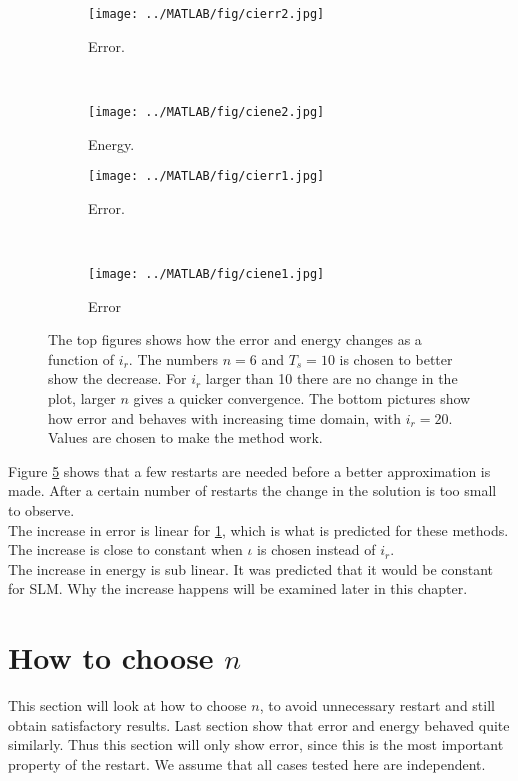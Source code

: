 \begin{figure}[H]
        \centering
        \begin{subfigure}[b]{0.45\textwidth}
                \texttt{[image: ../MATLAB/fig/cierr2.jpg]}
                \caption{ Error. }
                \label{fig:cierr2}
        \end{subfigure}
        ~
		\begin{subfigure}[b]{0.45\textwidth}
                \texttt{[image: ../MATLAB/fig/ciene2.jpg]}
                \caption{ Energy. }
                \label{fig:ciene2}
        \end{subfigure}    

        \begin{subfigure}[b]{0.45\textwidth}
                \texttt{[image: ../MATLAB/fig/cierr1.jpg]}
                \caption{ Error. }
                \label{fig:cierr1}
        \end{subfigure}
        ~
		\begin{subfigure}[b]{0.45\textwidth}
                \texttt{[image: ../MATLAB/fig/ciene1.jpg]}
                \caption{ Error }
                \label{fig:ciene1}
        \end{subfigure}
        \caption{ The top figures shows how the error and energy changes as a function of $i_r$. The numbers $n = 6$ and $T_s = 10$ is chosen to better show the decrease. For $i_r$ larger than 10 there are no change in the plot, larger $n$ gives a quicker convergence. The bottom pictures show how error and behaves with increasing time domain, with $i_r = 20$. Values are chosen to make the method work.  }
        \label{fig:ci}
\end{figure}
Figure \ref{fig:ci} shows that a few restarts are needed before a better approximation is made. After a certain number of restarts the change in the solution is too small to observe.  \\
The increase in error is linear for \ref{fig:cierr2}, which is what is predicted for these methods. The increase is close to constant when $\iota$ is chosen instead of $i_r$. \\
The increase in energy is sub linear. It was predicted that it would be constant for SLM. Why the increase happens will be examined later in this chapter.

\section{How to choose $n$}%
\label{sec:resultat}
This section will look at how to choose $n$, to avoid unnecessary restart and still obtain satisfactory results. Last section show that error and energy behaved quite similarly. Thus this section will only show error, since this is the most important property of the restart. We assume that all cases tested here are independent.

